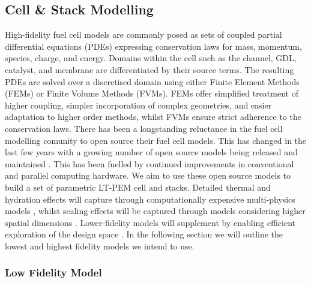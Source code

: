 \subsection{Cell \& Stack Modelling}
High-fidelity fuel cell models are commonly posed as sets of coupled partial differential equations (PDEs) expressing conservation laws for mass, momentum, species, charge, and energy.
Domains within the cell such as the channel, GDL, catalyst, and membrane are differentiated by their source terms. The resulting PDEs are solved over a discretised domain using either Finite Element Methods (FEMs) or Finite Volume Methods (FVMs).
FEMs offer simplified treatment of higher coupling, simpler incorporation of complex geometries, and easier adaptation to higher order methods, whilst FVMs ensure strict adherence to the conservation laws.
There has been a longstanding reluctance in the fuel cell modelling comunity to open source their fuel cell models.
This has changed in the last few years with a growing number of open source models being released and maintained \cite{vetterFreeOpenReference2019, secanellOpenFCSTOpenSourceMathematical2014, zhangOpenFuelCell2NewComputational2024,  koneOpenSourceToolboxPEM2018, gassAlphaPEMOpensourceDynamic2025}.
This has been fuelled by continued improvements in conventional and parallel computing hardware.
We aim to use these open source models to build a set of parametric LT-PEM cell and stacks.
Detailed thermal and hydration effects will capture through computationally expensive multi-physics models \cite{secanellOpenFCSTOpenSourceMathematical2014, zhangOpenFuelCell2NewComputational2024, vetterFreeOpenReference2019}, whilst scaling effects will be captured through models considering higher spatial dimensions \cite{secanellOpenFCSTOpenSourceMathematical2014, zhangOpenFuelCell2NewComputational2024, koneOpenSourceToolboxPEM2018}.
Lower-fidelity models will supplement by enabling efficient exploration of the design space \cite{kulikovskyPhysicallyBasedAnalytical2013a, ohayreFuelCellFundamentals2016, larminieFuelCellSystems2003}. In the following section we will outline the lowest and highest fidelity models we intend to use.

\subsubsection{Low Fidelity Model}


